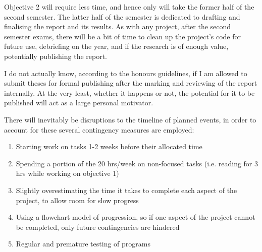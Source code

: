 Objective 2 will require less time, and hence only will take the former half of the second semester. The latter half of the semester is dedicated to drafting and finalising the report and its results. As with any project, after the second semester exams, there will be a bit of time to clean up the project's code for future use, debriefing on the year, and if the research is of enough value, potentially publishing the report.

I do not actually know, according to the honours guidelines, if I am allowed to submit theses for formal publishing after the marking and reviewing of the report internally. At the very least, whether it happens or not, the potential for it to be published will act as a large personal motivator.

There will inevitably be disruptions to the timeline of planned events, in order to account for these several contingency measures are employed:
\begin{enumerate}
\item Starting work on tasks 1-2 weeks before their allocated time
\item Spending a portion of the 20 hrs/week on non-focused tasks (i.e. reading for 3 hrs while working on objective 1)
\item Slightly overestimating the time it takes to complete each aspect of the project, to allow room for slow progress
\item Using a flowchart model of progression, so if one aspect of the project cannot be completed, only future contingencies are hindered
\item Regular and premature testing of programs
\end{enumerate}


